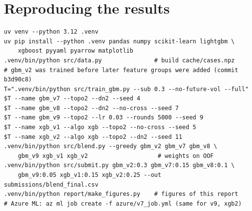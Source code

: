 \documentclass[11pt,a4paper]{article}
\begin{document}
\section{Reproducing the results}\label{app:repro}
\begin{footnotesize}
\begin{verbatim}
uv venv --python 3.12 .venv
uv pip install --python .venv pandas numpy scikit-learn lightgbm \
    xgboost pyyaml pyarrow matplotlib
.venv/bin/python src/data.py               # build cache/cases.npz
# gbm_v2 was trained before later feature groups were added (commit b3d90c8)
T=".venv/bin/python src/train_gbm.py --sub 0.3 --no-future-vol --full"
$T --name gbm_v7 --topo2 --dn2 --seed 4
$T --name gbm_v8 --topo2 --dn2 --no-cross --seed 7
$T --name gbm_v9 --topo2 --lr 0.03 --rounds 5000 --seed 9
$T --name xgb_v1 --algo xgb --topo2 --no-cross --seed 5
$T --name xgb_v2 --algo xgb --topo2 --dn2 --seed 11
.venv/bin/python src/blend.py --greedy gbm_v2 gbm_v7 gbm_v8 \
    gbm_v9 xgb_v1 xgb_v2                    # weights on OOF
.venv/bin/python src/submit.py gbm_v2:0.3 gbm_v7:0.15 gbm_v8:0.1 \
    gbm_v9:0.05 xgb_v1:0.15 xgb_v2:0.25 --out submissions/blend_final.csv
.venv/bin/python report/make_figures.py    # figures of this report
# Azure ML: az ml job create -f azure/v7_job.yml (same for v9, xgb2)
\end{verbatim}
\end{footnotesize}
\end{document}
